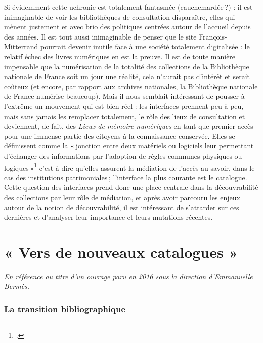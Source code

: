 Si évidemment cette uchronie est totalement fantasmée (cauchemardée ?) : il est inimaginable de voir les bibliothèques de consultation disparaître, elles qui mènent justement et avec brio des politiques centrées autour de l’accueil depuis des années. Il est tout aussi inimaginable de penser que le site François-Mitterrand pourrait devenir inutile face à une société totalement digitalisée : le relatif échec des livres numériques en est la preuve. Il est de toute manière impensable que la numérisation de la totalité des collections de la Bibliothèque nationale de France soit un jour une réalité, cela n’aurait pas d’intérêt et serait coûteux (et encore, par rapport aux archives nationales, la Bibliothèque nationale de France numérise beaucoup). Mais il nous semblait intéressant de pousser à l’extrême un mouvement qui est bien réel : les interfaces prennent peu à peu, mais sans jamais les remplacer totalement, le rôle des lieux de consultation et deviennent, de fait, des \textit{Lieux de mémoire numériques }en tant que premier accès pour une immense partie des citoyens à la connaissance conservée. Elles se définissent comme la « jonction entre deux matériels ou logiciels leur permettant d’échanger des informations par l’adoption de règles communes physiques ou logiques »\footcite{zotero-205} c’est-à-dire qu’elles assurent la médiation de l’accès au savoir, dans le cas des institutions patrimoniales ; l’interface la plus courante est le catalogue. Cette question des interfaces prend donc une place centrale dans la découvrabilité des collections par leur rôle de médiation, et après avoir parcouru les enjeux autour de la notion de découvrabilité, il est intéressant de s’attarder sur ces dernières et d’analyser leur importance et leurs mutations récentes.

\chapter{« Vers de nouveaux catalogues »}

\vspace{-3em} %

\textit{En référence au titre d’un ouvrage paru en 2016 sous la direction d’Emmanuelle Bermès.}

\subsection{La transition bibliographique}

